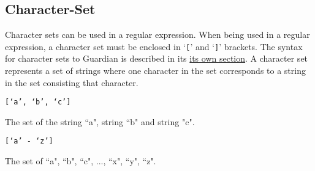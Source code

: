 
\subsection{Character-Set}
{
	Character sets can be used in a regular expression.
	When being used in a regular expression, a character set must be enclosed in
	`\texttt{[}' and `\texttt{]}' brackets.
	The syntax for character sets to Guardian is described in its
	\hyperref[sec:charset]{its own section}.
	A character set represents a set of strings where one character
	in the set corresponds to a string in the set consisting that character.
	
	\begin{itemize}
	{
		\item \texttt{[`a', `b', `c']}
		
			The set of the string ``a", string
			``b" and string "c".
		
		\item \texttt{[`a' - `z']}
		
			The set of ``a", ``b", ``c", ..., ``x", ``y", ``z".
	}
	\end{itemize}
	
}

